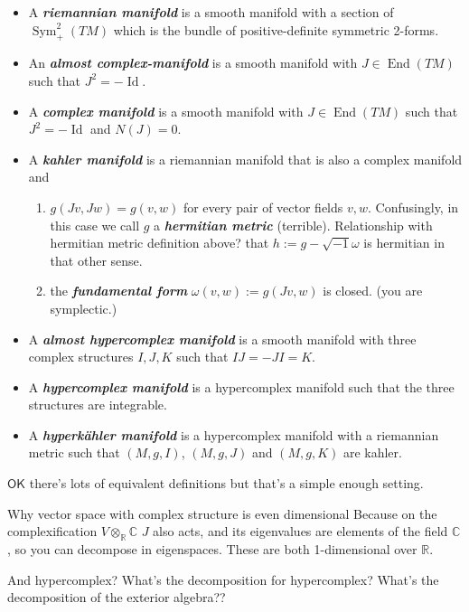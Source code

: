 \begin{itemize}
\item A \textit{\textbf{riemannian manifold}} is a smooth manifold with a section of \(\operatorname{Sym}^2_+(TM)\) which is the bundle of positive-definite symmetric 2-forms.
\item An \textit{\textbf{almost complex-manifold}} is a smooth manifold with \(J \in \operatorname{End}(TM)\) such that \(J^2=-\operatorname{Id}\).
\item A \textit{\textbf{complex manifold}} is a smooth manifold with \(J \in \operatorname{End}(TM)\) such that \(J^2=-\operatorname{Id}\) and \(N(J)=0\).
\item A \textit{\textbf{kahler manifold}} is a riemannian manifold that is also a complex manifold and
	\begin{enumerate}
	\item \(g(Jv,Jw)=g(v,w)\) for every pair of vector fields \(v,w\). Confusingly, in this case we call \(g\) a \textit{\textbf{hermitian metric}} (terrible). Relationship with hermitian metric definition above? that \(h:=g-\sqrt{-1}\omega\) is hermitian in that other sense.
	\item the \textit{\textbf{fundamental form}} \(\omega(v,w):=g(Jv,w)\) is closed. (you are symplectic.)
	\end{enumerate}
\item A \textit{\textbf{almost hypercomplex manifold}} is a smooth manifold with three complex structures \(I,J,K\) such that \(I J =- J I = K\).
\item A \textit{\textbf{hypercomplex manifold}} is a hypercomplex manifold such that the three structures are integrable.
\item A \textit{\textbf{hyperkähler manifold}} is a hypercomplex manifold with a riemannian metric such that \((M,g,I)\), \((M,g,J)\) and \((M,g,K)\) are kahler.
\end{itemize}
\(\mathsf{OK}\) there's lots of equivalent definitions but that's a simple enough setting.

\begin{thing8}{Why vector space with complex structure is even dimensional}\leavevmode
Because on the complexification \(V \otimes_{\mathbb{R}}\mathbb{C}\) \(J\) also acts, and its eigenvalues are elements of the field \(\mathbb{C}\), so you can decompose in eigenspaces. These are both 1-dimensional over \(\mathbb{R}\).
\end{thing8}

\begin{thing5}{And hypercomplex?}\leavevmode
What's the decomposition for hypercomplex? What's the decomposition of the exterior algebra??
\end{thing5}

